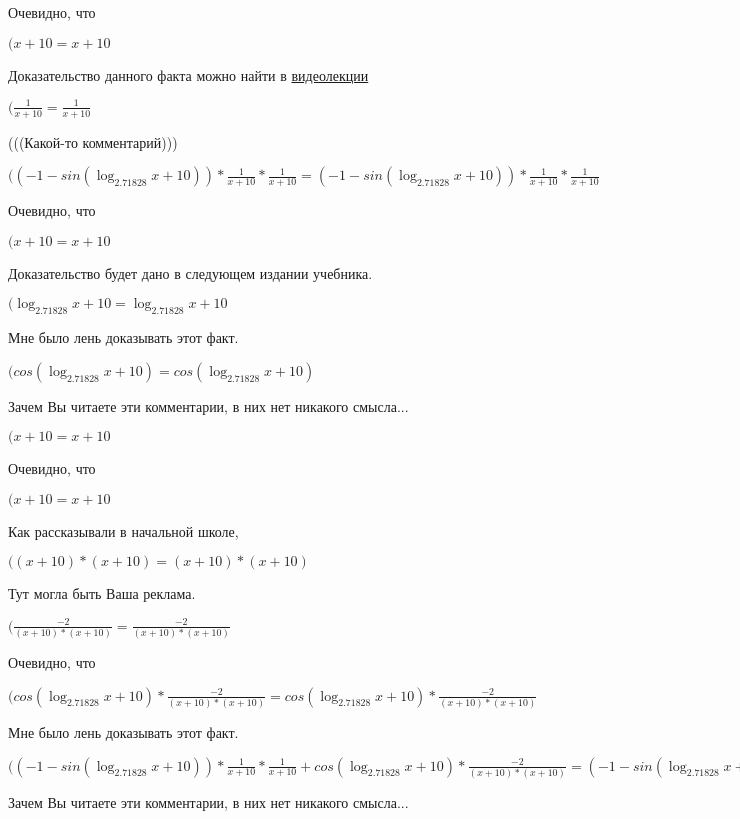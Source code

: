 \documentclass[12pt,a4paper,fleqn]{article}
\theoremstyle{definition}
\begin{document}
Очевидно, что

$( x  +  10  =  x  +  10 $

Доказательство данного факта можно найти в \href{https://www.youtube.com/watch?v=dQw4w9WgXcQ}{видеолекции}

$(\frac{ 1 }{ x  +  10 }
 = \frac{ 1 }{ x  +  10 }
$

(((Какой-то комментарий)))

$(( -1  - sin(\log_{ 2.71828 }{ x  +  10 })) * \frac{ 1 }{ x  +  10 }
 * \frac{ 1 }{ x  +  10 }
 = ( -1  - sin(\log_{ 2.71828 }{ x  +  10 })) * \frac{ 1 }{ x  +  10 }
 * \frac{ 1 }{ x  +  10 }
$

Очевидно, что

$( x  +  10  =  x  +  10 $

Доказательство будет дано в следующем издании учебника.

$(\log_{ 2.71828 }{ x  +  10 } = \log_{ 2.71828 }{ x  +  10 }$

Мне было лень доказывать этот факт.

$(cos(\log_{ 2.71828 }{ x  +  10 }) = cos(\log_{ 2.71828 }{ x  +  10 })$

Зачем Вы читаете эти комментарии, в них нет никакого смысла...

$( x  +  10  =  x  +  10 $

Очевидно, что

$( x  +  10  =  x  +  10 $

Как рассказывали в начальной школе,

$(( x  +  10 ) * ( x  +  10 ) = ( x  +  10 ) * ( x  +  10 )$

Тут могла быть Ваша реклама.

$(\frac{ -2 }{( x  +  10 ) * ( x  +  10 )}
 = \frac{ -2 }{( x  +  10 ) * ( x  +  10 )}
$

Очевидно, что

$(cos(\log_{ 2.71828 }{ x  +  10 }) * \frac{ -2 }{( x  +  10 ) * ( x  +  10 )}
 = cos(\log_{ 2.71828 }{ x  +  10 }) * \frac{ -2 }{( x  +  10 ) * ( x  +  10 )}
$

Мне было лень доказывать этот факт.

$(( -1  - sin(\log_{ 2.71828 }{ x  +  10 })) * \frac{ 1 }{ x  +  10 }
 * \frac{ 1 }{ x  +  10 }
 + cos(\log_{ 2.71828 }{ x  +  10 }) * \frac{ -2 }{( x  +  10 ) * ( x  +  10 )}
 = ( -1  - sin(\log_{ 2.71828 }{ x  +  10 })) * \frac{ 1 }{ x  +  10 }
 * \frac{ 1 }{ x  +  10 }
 + cos(\log_{ 2.71828 }{ x  +  10 }) * \frac{ -2 }{( x  +  10 ) * ( x  +  10 )}
$

Зачем Вы читаете эти комментарии, в них нет никакого смысла...
\end{document}
